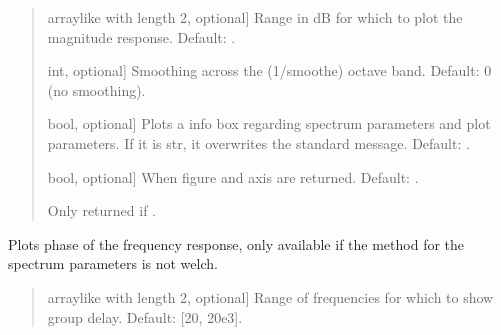 \documentclass[letterpaper,10pt,english]{sphinxmanual}
\begin{document}
\begin{fulllineitems}
\begin{fulllineitems}
\begin{quote}
\begin{description}
\begin{description}
\sphinxlineitem{\sphinxstylestrong{range\_db}}{[}array\sphinxhyphen{}like with length 2, optional{]}
\sphinxAtStartPar
Range in dB for which to plot the magnitude response.
Default: .

\sphinxlineitem{\sphinxstylestrong{smoothe}}{[}int, optional{]}
\sphinxAtStartPar
Smoothing across the (1/smoothe) octave band.
Default: 0 (no smoothing).

\sphinxlineitem{\sphinxstylestrong{show\_info\_box}}{[}bool, optional{]}
\sphinxAtStartPar
Plots a info box regarding spectrum parameters and plot parameters.
If it is str, it overwrites the standard message.
Default: .

\sphinxlineitem{\sphinxstylestrong{returns}}{[}bool, optional{]}
\sphinxAtStartPar
When  figure and axis are returned. Default: .

\end{description}

\begin{description}
\sphinxAtStartPar
Only returned if .

\end{description}

\end{description}\end{quote}

\end{fulllineitems}


\begin{fulllineitems}
\label{\detokenize{classes:dsptools.classes.signal_class.Signal.plot_phase}}
\pysigstartsignatures
{}
\pysigstopsignatures
\sphinxAtStartPar
Plots phase of the frequency response, only available if the method
for the spectrum parameters is not welch.
\begin{quote}\begin{description}
\begin{description}
\sphinxlineitem{\sphinxstylestrong{range\_hz}}{[}array\sphinxhyphen{}like with length 2, optional{]}
\sphinxAtStartPar
Range of frequencies for which to show group delay.
Default: {[}20, 20e3{]}.


\end{description}
\end{description}
\end{quote}
\end{fulllineitems}
\end{fulllineitems}
\end{document}
